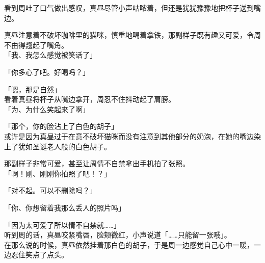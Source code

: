 看到周吐了口气做出感叹，真昼尽管小声咕哝着，但还是犹犹豫豫地把杯子送到嘴边。

真昼注意着不破坏咖啡里的猫咪，慎重地喝着拿铁，那副样子既有趣又可爱，令周不由得翘起了嘴角。\\

「我、我怎么感觉被笑话了」

「你多心了吧。好喝吗？」

「嗯，那是自然」\\

看着真昼将杯子从嘴边拿开，周忍不住抖动起了肩膀。\\

「为、为什么笑起来了啊」

「那个，你的脸沾上了白色的胡子」\\

或许是因为真昼过于在意不破坏猫咪而没有注意到其他部分的奶泡，在她的嘴边染上了犹如圣诞老人般的白色胡子。

那副样子非常可爱，甚至让周情不自禁拿出手机拍了张照。\\

「啊！刚、刚刚你拍照了吧！？」

「对不起。可以不删除吗？」

「你、你想留着我那么丢人的照片吗」

「因为太可爱了所以情不自禁就……」\\

听到周的话，真昼咬紧嘴唇，脸颊微红，小声说道「……只能留一张哦」。\\

在那么说的时候，真昼依然挂着那白色的胡子，于是周一边感觉自己心中一暖，一边忍住笑点了点头。
